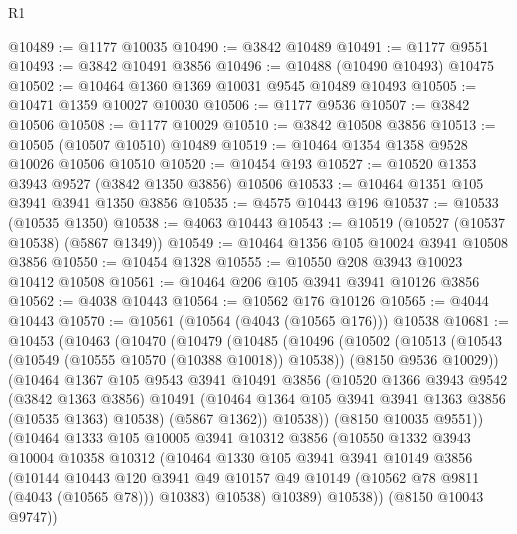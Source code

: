 \begin{lexlean}{R1}
\begin{coremodule}
@10489 := @1177 @10035
@10490 := @3842 @10489
@10491 := @1177 @9551
@10493 := @3842 @10491 @3856
@10496 := @10488 (@10490 @10493) @10475
@10502 := @10464 @1360 @1369 @10031 @9545 @10489 @10493
@10505 := @10471 @1359 @10027 @10030
@10506 := @1177 @9536
@10507 := @3842 @10506
@10508 := @1177 @10029
@10510 := @3842 @10508 @3856
@10513 := @10505 (@10507 @10510) @10489
@10519 := @10464 @1354 @1358 @9528 @10026 @10506 @10510
@10520 := @10454 @193
@10527 := @10520 @1353 @3943 @9527 (@3842 @1350 @3856) @10506
@10533 := @10464 @1351 @105 @3941 @3941 @1350 @3856
@10535 := @4575 @10443 @196
@10537 := @10533 (@10535 @1350)
@10538 := @4063 @10443
@10543 := @10519 (@10527 (@10537 @10538) (@5867 @1349))
@10549 := @10464 @1356 @105 @10024 @3941 @10508 @3856
@10550 := @10454 @1328
@10555 := @10550 @208 @3943 @10023 @10412 @10508
@10561 := @10464 @206 @105 @3941 @3941 @10126 @3856
@10562 := @4038 @10443
@10564 := @10562 @176 @10126
@10565 := @4044 @10443
@10570 := @10561 (@10564 (@4043 (@10565 @176))) @10538
@10681 := @10453
    (@10463
      (@10470
        (@10479
          (@10485
            (@10496
              (@10502
                (@10513
                  (@10543 (@10549 (@10555 @10570 (@10388 @10018)) @10538))
                  (@8150 @9536 @10029))
                (@10464
                  @1367
                  @105
                  @9543
                  @3941
                  @10491
                  @3856
                  (@10520
                    @1366
                    @3943
                    @9542
                    (@3842 @1363 @3856)
                    @10491
                    (@10464 @1364 @105 @3941 @3941 @1363 @3856 (@10535 @1363) @10538)
                    (@5867 @1362))
                  @10538))
              (@8150 @10035 @9551))
            (@10464
              @1333
              @105
              @10005
              @3941
              @10312
              @3856
              (@10550
                @1332
                @3943
                @10004
                @10358
                @10312
                (@10464
                  @1330
                  @105
                  @3941
                  @3941
                  @10149
                  @3856
                  (@10144
                    @10443
                    @120
                    @3941
                    @49
                    @10157
                    @49
                    @10149
                    (@10562 @78 @9811 (@4043 (@10565 @78)))
                    @10383)
                  @10538)
                @10389)
              @10538))
          (@8150 @10043 @9747))

\end{coremodule}
\end{lexlean}
